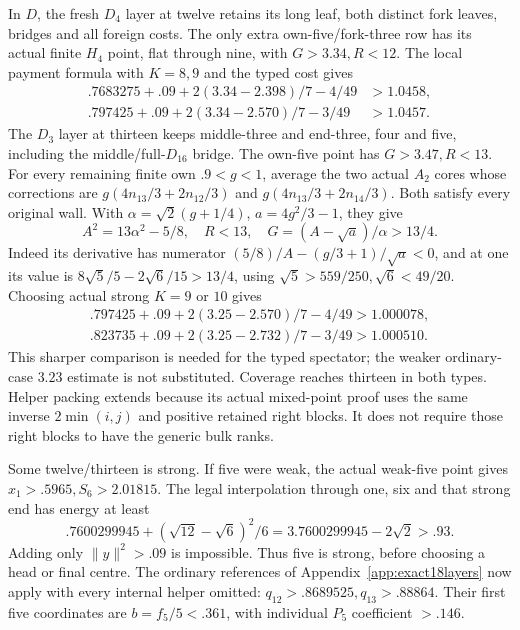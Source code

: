 \documentclass[11pt]{article}
\theoremstyle{definition}
\theoremstyle{remark}
\newcommand{\norm}[1]{\lVert #1\rVert}
\begin{document}
In \(D\), the fresh \(D_4\) layer at twelve retains its long
leaf, both distinct fork leaves, bridges and all foreign costs.
The only extra own-five/fork-three row has its actual finite
\(H_4\) point, flat through nine, with \(G>3.34,R<12\).
The local payment formula with \(K=8,9\) and the typed cost gives
\[
\begin{split}
 .7683275+.09+2(3.34-2.398)/7-4/49&>1.0458,\\
 .797425+.09+2(3.34-2.570)/7-3/49&>1.0457.
\end{split}
\]
The \(D_3\) layer at thirteen keeps middle-three and end-three,
four and five, including the middle/full-\(D_{16}\) bridge.
The own-five point has \(G>3.47,R<13\). For every remaining
finite own \(.9<g<1\), average the two actual \(A_2\) cores
whose corrections are \(g(4n_{13}/3+2n_{12}/3)\) and
\(g(4n_{13}/3+2n_{14}/3)\). Both satisfy every original wall.
With \(\alpha=\sqrt2(g+1/4)\), \(a=4g^2/3-1\), they give
\[
 A^2=13\alpha^2-5/8,\quad R<13,\quad
 G=(A-\sqrt a)/\alpha>13/4.
\]
Indeed its derivative has numerator
\((5/8)/A-(g/3+1)/\sqrt a<0\), and at one its value is
\(8\sqrt5/5-2\sqrt6/15>13/4\), using
\(\sqrt5>559/250,\sqrt6<49/20\).
Choosing actual strong \(K=9\) or \(10\) gives
\[
\begin{gathered}
 .797425+.09+2(3.25-2.570)/7-4/49>1.000078,\\
 .823735+.09+2(3.25-2.732)/7-3/49>1.000510.
\end{gathered}
\]
This sharper comparison is needed for the typed spectator; the weaker
ordinary-case \(3.23\) estimate is not substituted. Coverage reaches
thirteen in both types. Helper packing extends because its actual
mixed-point proof uses the same inverse \(2\min(i,j)\) and positive
retained right blocks. It does not require those right blocks to have
the generic bulk ranks.

Some twelve/thirteen is strong. If five were weak, the actual
weak-five point gives \(x_1>.5965,S_6>2.01815\). The legal
interpolation through one, six and that strong end has energy at least
\[
 .7600299945+(\sqrt{12}-\sqrt6)^2/6
             =3.7600299945-2\sqrt2>.93.
\]
Adding only \(\norm y^2>.09\) is impossible. Thus five is strong,
before choosing a head or final centre. The ordinary references of
Appendix~\ref{app:exact18layers} now apply with every internal helper
omitted: \(q_{12}>.8689525,q_{13}>.88864\). Their first five
coordinates are \(b=f_5/5<.361\), with individual \(P_5\)
coefficient \(>.146\).
\end{document}
